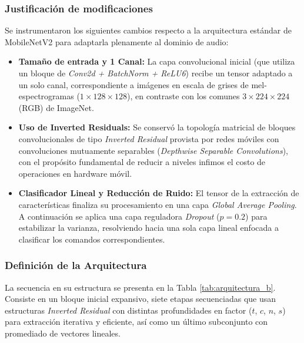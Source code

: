 \documentclass[conference]{IEEEtran}
\begin{document}
\subsubsection{Justificación de modificaciones}
Se instrumentaron los siguientes cambios respecto a la arquitectura estándar de MobileNetV2 para adaptarla plenamente al dominio de audio:
\begin{itemize}
    \item \textbf{Tamaño de entrada y 1 Canal:} La capa convolucional inicial (que utiliza un bloque de \textit{Conv2d + BatchNorm + ReLU6}) recibe un tensor adaptado a un solo canal, correspondiente a imágenes en escala de grises de mel-espectrogramas ($1 \times 128 \times 128$), en contraste con los comunes $3 \times 224 \times 224$ (RGB) de ImageNet.
    \item \textbf{Uso de Inverted Residuals:} Se conservó la topología matricial de bloques convolucionales de tipo \textit{Inverted Residual} provista por redes móviles con convoluciones mutuamente separables (\textit{Depthwise Separable Convolutions}), con el propósito fundamental de reducir a niveles infimos el costo de operaciones en hardware móvil.
    \item \textbf{Clasificador Lineal y Reducción de Ruido:} El tensor de la extracción de características finaliza su procesamiento en una capa \textit{Global Average Pooling}. A continuación se aplica una capa reguladora \textit{Dropout} ($p=0.2$) para estabilizar la varianza, resolviendo hacia una sola capa lineal enfocada a clasificar los comandos correspondientes.
\end{itemize}

\subsubsection{Definición de la Arquitectura}
La secuencia en su estructura se presenta en la Tabla \ref{tab:arquitectura_b}. Consiste en un bloque inicial expansivo, siete etapas secuenciadas que usan estructuras \textit{Inverted Residual} con distintas profundidades en factor ($t$, $c$, $n$, $s$) para extracción iterativa y eficiente, así como un último subconjunto con promediado de vectores lineales.
\end{document}
